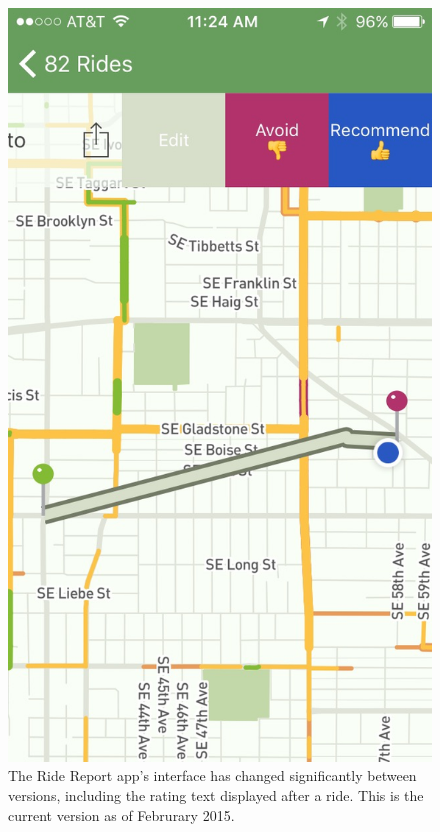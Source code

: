 \documentclass[12pt,twoside]{reedthesis}
\begin{document}
  \begin{figure}[tbh]
  \centering
  \includegraphics[angle = 0,scale = 0.2]{figure/ride_report_rating.jpg}
  \caption[The Ride Report app's interface]{\normalsize{The Ride Report app's interface has changed significantly between
  versions, including the rating text displayed after a ride. This is the current
  version as of Februrary 2015.}}
  \label{fig:ride-rating}
  \end{figure}
  
\end{document}
